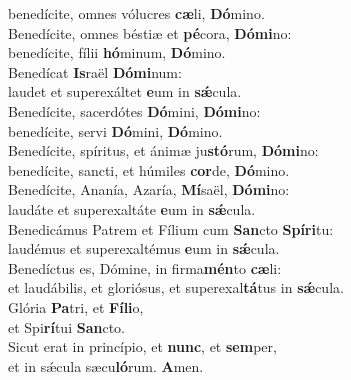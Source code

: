 \oddverse benedícite, omnes vólucres \textbf{cæ}li, \textbf{Dó}mino.\\
\evenverse Benedícite, omnes béstiæ et \textbf{pé}cora, \textbf{Dó}\textbf{mi}no:~\*\\
\evenverse benedícite, fílii \textbf{hó}minum, \textbf{Dó}mino.\\
\oddverse Benedícat \textbf{Is}raël \textbf{Dó}\textbf{mi}num:~\*\\
\oddverse laudet et superexáltet \textbf{e}um in \textbf{sǽ}cula.\\
\evenverse Benedícite, sacerdótes \textbf{Dó}mini, \textbf{Dó}\textbf{mi}no:~\*\\
\evenverse benedícite, servi \textbf{Dó}mini, \textbf{Dó}mino.\\
\oddverse Benedícite, spíritus, et ánimæ ju\textbf{stó}rum, \textbf{Dó}\textbf{mi}no:~\*\\
\oddverse benedícite, sancti, et húmiles \textbf{cor}de, \textbf{Dó}mino.\\
\evenverse Benedícite, Ananía, Azaría, \textbf{Mí}saël, \textbf{Dó}\textbf{mi}no:~\*\\
\evenverse laudáte et superexaltáte \textbf{e}um in \textbf{sǽ}cula.\\
\oddverse Benedicámus Patrem et Fílium cum \textbf{San}cto \textbf{Spí}\textbf{ri}tu:~\*\\
\oddverse laudémus et superexaltémus \textbf{e}um in \textbf{sǽ}cula.\\
\evenverse Benedíctus es, Dómine, in firma\textbf{mén}to \textbf{cæ}li:~\*\\
\evenverse et laudábilis, et gloriósus, et superexal\textbf{tá}tus in \textbf{sǽ}cula.\\
\oddverse Glória \textbf{Pa}tri, et \textbf{Fí}\textbf{li}o,~\*\\
\oddverse et Spi\textbf{rí}tui \textbf{San}cto.\\
\evenverse Sicut erat in princípio, et \textbf{nunc}, et \textbf{sem}per,~\*\\
\evenverse et in sǽcula sæcu\textbf{ló}rum. \textbf{A}men.\\
